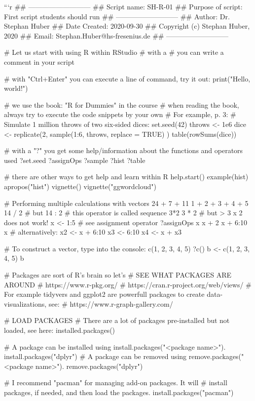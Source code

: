 ```r
## ---------------------------
## Script name: SH-R-01
## Purpose of script: First script students should run
## ---------------------------
## Author: Dr. Stephan Huber
## Date Created: 2020-09-30
## Copyright (c) Stephan Huber, 2020
## Email: Stephan.Huber@hs-fresenius.de
## ---------------------------


# Let us start with using R within RStudio
# with a # you can write a comment in your script

# with "Ctrl+Enter" you can execute a line of command, try it out:
print("Hello, world!")

# we use the book: "R for Dummies" in the course
# when reading the book, always try to execute the code snippets by your own
# For example, p. 3:
# Simulate 1 million throws of two six‐sided dices:
set.seed(42)
throws <- 1e6
dice <- replicate(2,
                  sample(1:6, throws, replace = TRUE)
)
table(rowSums(dice))
 
# with a "?" you get some help/information about the functions and operators used 
?set.seed
?assignOps
?sample
?hist
?table

# there are other ways to get help and learn within R
help.start()
example(hist)
apropos("hist")
vignette()
vignette("ggwordcloud")

# Performing multiple calculations with vectors
24 + 7 + 11
1 + 2 + 3 + 4 + 5
14 / 2
# but
14 : 2 # this operator is called sequence
3*2
3      *       2
# but > 3 x 2 does not work!
x <- 1:5  # see assignment operator ?assignOps
x
x + 2
x + 6:10
x
# alternatively:
x2 <- x + 6:10
x3 <- 6:10
x4 <- x + x3

# To construct a vector, type into the console:
c(1, 2, 3, 4, 5)
?c()
b <- c(1, 2, 3, 4, 5)
b

# Packages are sort of R's brain so let's 
# SEE WHAT PACKAGES ARE AROUND
# https://www.r-pkg.org/
# https://cran.r-project.org/web/views/
# For example tidyvers and ggplot2 are powerfull packages to create data-visualizations, see:
# https://www.r-graph-gallery.com/

# LOAD PACKAGES 
# There are a lot of packages pre-installed but not loaded, see here: 
installed.packages()

# A package can be installed using install.packages("<package name>"). 
install.packages("dplyr")
# A package can be removed using remove.packages("<package name>").
remove.packages("dplyr")

# I recommend "pacman" for managing add-on packages. It will
# install packages, if needed, and then load the packages.
install.packages("pacman")

